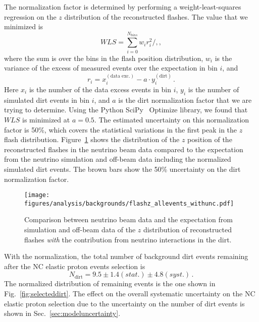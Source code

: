     The normalization factor is determined by performing a weight-least-squares
    regression on the $z$ distribution of the reconstructed flashes. The value
    that we minimized is
    \begin{equation*}
      WLS = \sum_{i=0}^{N_{bins}} w_i r_i^2 /,,
    \end{equation*}
    where the sum is over the bins in the flash position distribution, $w_i$ is
    the variance of the excess of measured events over the expectation in bin
    $i$, and
    \begin{equation*}
      r_i = x_i^{(\textrm{data exc.})} - a\cdot y_i^{(\textrm{dirt})} \,.
    \end{equation*}
    Here $x_i$ is the number of the data excess events in bin $i$, $y_i$ is the
    number of simulated dirt events in bin $i$, and $a$ is the dirt
    normalization factor that we are trying to determine. Using the Python
    SciPy~\cite{SciPy} Optimize library, we found that $WLS$ is minimized at $a
    = 0.5$. The estimated uncertainty on this normalization factor is 50\%,
    which covers the statistical variations in the first peak in the $z$ flash
    distribution. Figure~\ref{fig:flashwithdirt} shows the distribution of the
    $z$ position of the reconstructed flashes in the neutrino beam data
    compared to the expectation from the neutrino simulation and off-beam data
    including the normalized simulated dirt events. The brown bars show the
    50\% uncertainty on the dirt normalization factor.
    \begin{figure}[ht]
      \centering
      \texttt{[image: figures/analysis/backgrounds/flashz\_allevents\_withunc.pdf]}
      \caption{Comparison between neutrino beam data and the expectation from
      simulation and off-beam data of the $z$ distribution of reconstructed
      flashes \textit{with} the contribution from neutrino interactions in
      the dirt.}
      \label{fig:flashwithdirt}
    \end{figure}

    With the normalization, the total number of background dirt events
    remaining after the NC elastic proton events selection is
    \begin{equation*}
     N_{\textrm{dirt}} = 9.5 \pm 1.4(stat.) \pm 4.8 (syst.) \,. 
    \end{equation*}
    The normalized distribution of remaining events is the one shown in
    Fig.~\ref{fig:selecteddirt}. The effect on the overall systematic
    uncertainty on the NC elastic proton selection due to the uncertainty on
    the number of dirt events is shown in Sec.~\ref{sec:modeluncertainty}.


